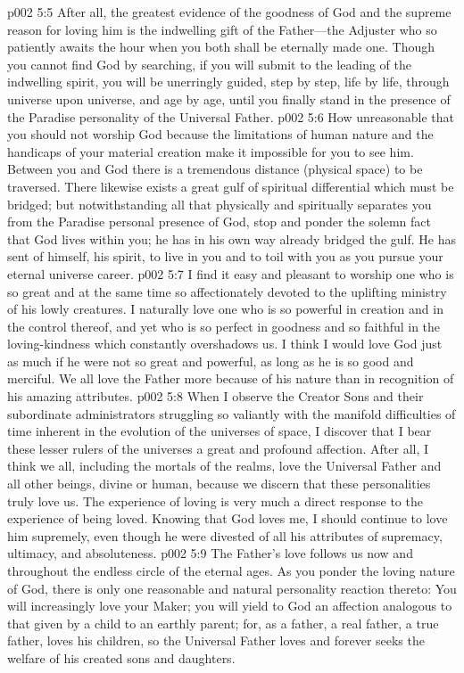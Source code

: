\vs p002 5:5 After all, the greatest evidence of the goodness of God and the supreme reason for loving him is the indwelling gift of the Father---the Adjuster who so patiently awaits the hour when you both shall be eternally made one. Though you cannot find God by searching, if you will submit to the leading of the indwelling spirit, you will be unerringly guided, step by step, life by life, through universe upon universe, and age by age, until you finally stand in the presence of the Paradise personality of the Universal Father.
\pc \vs p002 5:6 How unreasonable that you should not worship God because the limitations of human nature and the handicaps of your material creation make it impossible for you to see him. Between you and God there is a tremendous distance (physical space) to be traversed. There likewise exists a great gulf of spiritual differential which must be bridged; but notwithstanding all that physically and spiritually separates you from the Paradise personal presence of God, stop and ponder the solemn fact that God lives within you; he has in his own way already bridged the gulf. He has sent of himself, his spirit, to live in you and to toil with you as you pursue your eternal universe career.
\vs p002 5:7 I find it easy and pleasant to worship one who is so great and at the same time so affectionately devoted to the uplifting ministry of his lowly creatures. I naturally love one who is so powerful in creation and in the control thereof, and yet who is so perfect in goodness and so faithful in the loving\hyp{}kindness which constantly overshadows us. I think I would love God just as much if he were not so great and powerful, as long as he is so good and merciful. We all love the Father more because of his nature than in recognition of his amazing attributes.
\vs p002 5:8 When I observe the Creator Sons and their subordinate administrators struggling so valiantly with the manifold difficulties of time inherent in the evolution of the universes of space, I discover that I bear these lesser rulers of the universes a great and profound affection. After all, I think we all, including the mortals of the realms, love the Universal Father and all other beings, divine or human, because we discern that these personalities truly love us. The experience of loving is very much a direct response to the experience of being loved. Knowing that God loves me, I should continue to love him supremely, even though he were divested of all his attributes of supremacy, ultimacy, and absoluteness.
\vs p002 5:9 The Father’s love follows us now and throughout the endless circle of the eternal ages. As you ponder the loving nature of God, there is only one reasonable and natural personality reaction thereto: You will increasingly love your Maker; you will yield to God an affection analogous to that given by a child to an earthly parent; for, as a father, a real father, a true father, loves his children, so the Universal Father loves and forever seeks the welfare of his created sons and daughters.
